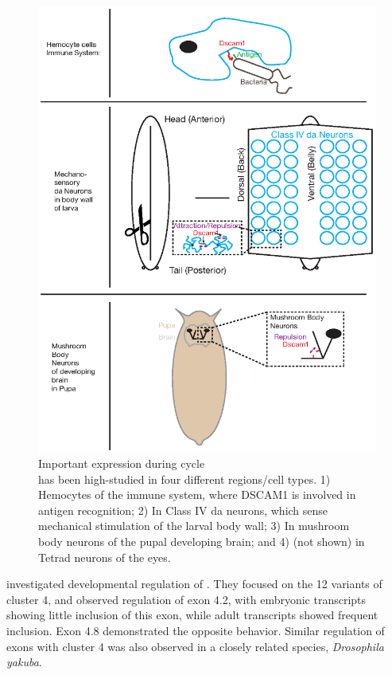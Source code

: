     \begin{figure} %
      \centering 
      \includegraphics{Figures/Intro/DscamAnatomy.eps}
      \caption[Important \dscam{} expression during \flies{} life cycle]
      {
        Important \dscam{} expression during \flies{} cycle\\[0.25cm]
        \dscam{} has been high-studied in four different regions/cell types. 1) Hemocytes of the immune system, where DSCAM1 is involved in antigen recognition; 2) In Class IV da neurons, which sense mechanical stimulation of the larval body wall; 3) In mushroom body neurons of the pupal developing brain; and 4) (not shown) in Tetrad neurons of the eyes.
        }
      \label{Intro:fig:DscamAnatomy}
      \end{figure}

    \citet{Celotto2001} investigated developmental regulation of \dscam{}. They focused on the 12 variants of cluster 4, and observed regulation of exon 4.2, with embryonic transcripts showing little inclusion of this exon, while adult transcripts showed frequent inclusion. Exon 4.8 demonstrated the opposite behavior. Similar regulation of exons with cluster 4 was also observed in a closely related species, \textit{Drosophila yakuba}. 

